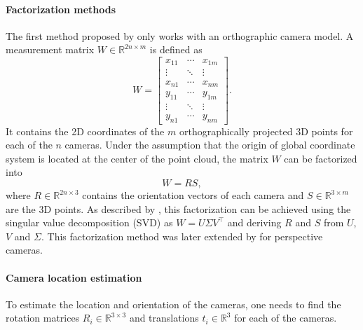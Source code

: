         	\paragraph{Factorization methods}
        		The first method proposed by \cite{tomasi1992factorization} only works with an orthographic camera model.
        		A measurement matrix $W \in \mathbb{R}^{2n \times m}$ is defined as
        		\begin{equation}
        			W =
        			\begin{bmatrix}
        			x_{11} & \cdots & x_{1m} \\ 
        			\vdots & \ddots & \vdots \\ 
        			x_{n1} & \cdots & x_{nm} \\ 
        			y_{11} & \cdots & y_{1m} \\ 
        			\vdots & \ddots  & \vdots \\ 
        			y_{n1} & \cdots & y_{nm}
        			\end{bmatrix}. 
        		\end{equation}
        		It contains the 2D coordinates of the $m$ orthographically projected 3D points for each of the $n$ cameras.
        		Under the assumption that the origin of global coordinate system is located at the center of the point cloud, the matrix $W$ can be factorized into
        		\begin{equation}
        			W = RS,
        		\end{equation}
        		where $R \in \mathbb{R}^{2n \times 3}$ contains the orientation vectors of each camera and $S \in \mathbb{R}^{3 \times m}$  are the 3D points.
        		As described by \cite{tomasi1992factorization}, this factorization can be achieved using the singular value decomposition (SVD) as $W = U \varSigma V^\top$ and deriving $R$ and $S$ from $U$, $V$ and $\varSigma$.
        		This factorization method was later extended by \cite{sturm1996factorization} for perspective cameras.
        		
        	\paragraph{Camera location estimation}
        		To estimate the location and orientation of the cameras, one needs to find the rotation matrices $R_i \in \mathbb{R}^{3 \times 3}$ and translations $t_i \in \mathbb{R}^{3}$ for each of the cameras.
        	
